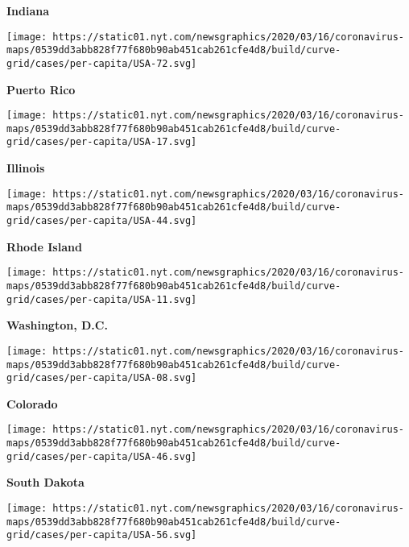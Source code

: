 \textbf{Indiana}

\href{https://www.nytimes.com/interactive/2020/us/puerto-rico-coronavirus-cases.html}{}

\texttt{[image: https://static01.nyt.com/newsgraphics/2020/03/16/coronavirus-maps/0539dd3abb828f77f680b90ab451cab261cfe4d8/build/curve-grid/cases/per-capita/USA-72.svg]}

\textbf{Puerto Rico}

\href{https://www.nytimes.com/interactive/2020/us/illinois-coronavirus-cases.html}{}

\texttt{[image: https://static01.nyt.com/newsgraphics/2020/03/16/coronavirus-maps/0539dd3abb828f77f680b90ab451cab261cfe4d8/build/curve-grid/cases/per-capita/USA-17.svg]}

\textbf{Illinois}

\href{https://www.nytimes.com/interactive/2020/us/rhode-island-coronavirus-cases.html}{}

\texttt{[image: https://static01.nyt.com/newsgraphics/2020/03/16/coronavirus-maps/0539dd3abb828f77f680b90ab451cab261cfe4d8/build/curve-grid/cases/per-capita/USA-44.svg]}

\textbf{Rhode Island}

\href{https://www.nytimes.com/interactive/2020/us/washington-dc-coronavirus-cases.html}{}

\texttt{[image: https://static01.nyt.com/newsgraphics/2020/03/16/coronavirus-maps/0539dd3abb828f77f680b90ab451cab261cfe4d8/build/curve-grid/cases/per-capita/USA-11.svg]}

\textbf{Washington, D.C.}

\href{https://www.nytimes.com/interactive/2020/us/colorado-coronavirus-cases.html}{}

\texttt{[image: https://static01.nyt.com/newsgraphics/2020/03/16/coronavirus-maps/0539dd3abb828f77f680b90ab451cab261cfe4d8/build/curve-grid/cases/per-capita/USA-08.svg]}

\textbf{Colorado}

\href{https://www.nytimes.com/interactive/2020/us/south-dakota-coronavirus-cases.html}{}

\texttt{[image: https://static01.nyt.com/newsgraphics/2020/03/16/coronavirus-maps/0539dd3abb828f77f680b90ab451cab261cfe4d8/build/curve-grid/cases/per-capita/USA-46.svg]}

\textbf{South Dakota}

\href{https://www.nytimes.com/interactive/2020/us/wyoming-coronavirus-cases.html}{}

\texttt{[image: https://static01.nyt.com/newsgraphics/2020/03/16/coronavirus-maps/0539dd3abb828f77f680b90ab451cab261cfe4d8/build/curve-grid/cases/per-capita/USA-56.svg]}

